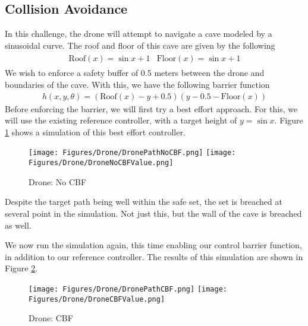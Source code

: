 \subsection{Collision Avoidance}

\noindent In this challenge, the drone will attempt to navigate a cave modeled by a sinusoidal curve. The roof and floor of this cave are given by the following 
\begin{align}
    \begin{split}
        \text{Roof}(x) = \sin{x} + 1
    \end{split}
    \begin{split}
        \text{Floor}(x) = \sin{x} + 1
    \end{split}
\end{align}
\noindent We wish to enforce a safety buffer of 0.5 meters between the drone and boundaries of the cave. With this, we have the following barrier function
\begin{align}
    h(x, y, \theta) = (\text{Roof}(x) - y + 0.5)(y - 0.5 - \text{Floor}(x))
\end{align}
\noindent Before enforcing the barrier, we will first try a best effort approach. For this, we will use the existing reference controller, with a target height of $y = \sin{x}.$ Figure \ref{fig:DronePathNoCBF} shows a simulation of this best effort controller. 

\begin{figure}[H]
    \centering
    \texttt{[image: Figures/Drone/DronePathNoCBF.png]}
    \texttt{[image: Figures/Drone/DroneNoCBFValue.png]}
    \caption{Drone: No CBF}
    \label{fig:DronePathNoCBF}
\end{figure}

\noindent Despite the target path being well within the safe set, the set is breached at several point in the simulation. Not just this, but the wall of the cave is breached as well. \newline

\noindent We now run the simulation again, this time enabling our control barrier function, in addition to our reference controller. The results of this simulation are shown in Figure \ref{fig:DronePathCBF}.

\begin{figure}[H]
    \centering
    \texttt{[image: Figures/Drone/DronePathCBF.png]}
    \texttt{[image: Figures/Drone/DroneCBFValue.png]}
    \caption{Drone: CBF}
    \label{fig:DronePathCBF}
\end{figure}
